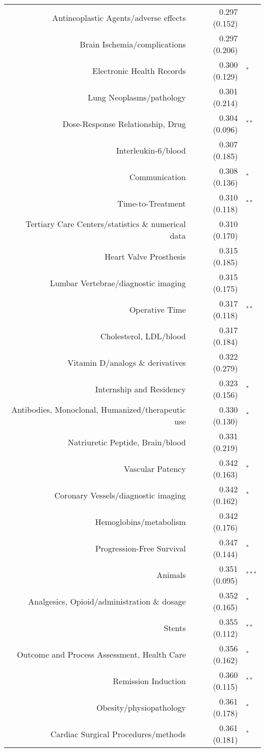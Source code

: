 \begin{longtable}[l]{rr@{}l@{ }}
Antineoplastic Agents/adverse effects & 0.297 (0.152) & $^{}$\\
Brain Ischemia/complications & 0.297 (0.206) & $^{}$\\
Electronic Health Records & 0.300 (0.129) & $^{*}$\\
Lung Neoplasms/pathology & 0.301 (0.214) & $^{}$\\
Dose-Response Relationship, Drug & 0.304 (0.096) & $^{**}$\\
Interleukin-6/blood & 0.307 (0.185) & $^{}$\\
Communication & 0.308 (0.136) & $^{*}$\\
Time-to-Treatment & 0.310 (0.118) & $^{**}$\\
Tertiary Care Centers/statistics \& numerical data & 0.310 (0.170) & $^{}$\\
Heart Valve Prosthesis & 0.315 (0.185) & $^{}$\\
Lumbar Vertebrae/diagnostic imaging & 0.315 (0.175) & $^{}$\\
Operative Time & 0.317 (0.118) & $^{**}$\\
Cholesterol, LDL/blood & 0.317 (0.184) & $^{}$\\
Vitamin D/analogs \& derivatives & 0.322 (0.279) & $^{}$\\
Internship and Residency & 0.323 (0.156) & $^{*}$\\
Antibodies, Monoclonal, Humanized/therapeutic use & 0.330 (0.130) & $^{*}$\\
Natriuretic Peptide, Brain/blood & 0.331 (0.219) & $^{}$\\
Vascular Patency & 0.342 (0.163) & $^{*}$\\
Coronary Vessels/diagnostic imaging & 0.342 (0.162) & $^{*}$\\
Hemoglobins/metabolism & 0.342 (0.176) & $^{}$\\
Progression-Free Survival & 0.347 (0.144) & $^{*}$\\
Animals & 0.351 (0.095) & $^{***}$\\
Analgesics, Opioid/administration \& dosage & 0.352 (0.165) & $^{*}$\\
Stents & 0.355 (0.112) & $^{**}$\\
Outcome and Process Assessment, Health Care & 0.356 (0.162) & $^{*}$\\
Remission Induction & 0.360 (0.115) & $^{**}$\\
Obesity/physiopathology & 0.361 (0.178) & $^{*}$\\
Cardiac Surgical Procedures/methods & 0.361 (0.181) & $^{*}$\\

\end{longtable}
